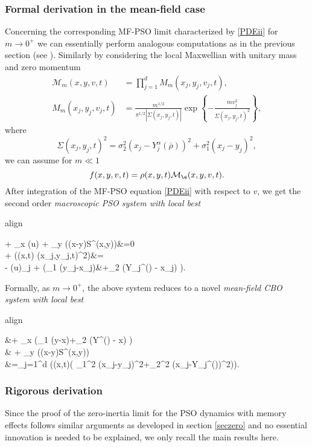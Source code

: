 \documentclass{ims9x6}
\newcommand{\coloredeq}[2]{\begin{empheq}[box={\mymath[colback=gray!13, sharp corners]}]{align}\label{#1}#2\end{empheq}}
\renewcommand{\bar}{\overline}
\begin{document}
\subsubsection{Formal derivation in the mean-field case}
Concerning the corresponding MF-PSO limit characterized by \eqref{PDEii} for $m\to 0^+$ we can essentially perform analogous computations as in the previous section (see \cite{Grassi2021PSO}). Similarly by considering the local Maxwellian with unitary mass and zero momentum
\[
\begin{split}
{\mathcal M}_m(x,y,v,t)&= \prod_{j=1}^d M_{m}(x_j,y_j,v_j,t), \\
M_{m}(x_j,y_j,v_j,t) &= \frac{m^{1/2}}{\pi^{1/2} |\Sigma(x_j,y_j,t)|} 
\exp\left\{-\frac{m v_j^2}{\Sigma(x_j,y_j,t)^2}\right\},
\end{split}
\]
where
\[
\Sigma(x_j,y_j,t)^2 = {\sigma_2^2}(x_j - Y^\alpha_j(\bar\rho))^2+{\sigma_1^2}(x_j - y_j)^2,
\]
we can assume for $m \ll 1$
\begin{equation}
f(x,y,v,t)=\rho(x,y,t){\mathcal M}_\e(x,y,v,t).
\label{eq:maxw2}
\end{equation}
After integration of the MF-PSO equation \eqref{PDEii} with respect to $v$, we get the second order \emph{macroscopic PSO system with local best}
\coloredeq{eq:macro2}{
\begin{split}
\frac{\partial \rho}{\partial t} + \nabla_x \cdot (\rho u) + \nabla_y \cdot \left(\nu(x-y)S^\beta(x,y)\rho\right)&=0\\
\frac{\partial (\rho u)_j}{\partial t} + \frac{\sigma^2}{2 m}\frac{\partial}{\partial x_j} \left(\rho(x,t) \Sigma(x_j,y_j,t)^2\right)&= \\
-\frac{\gamma}{m} (\rho u)_j + \frac1{m} (\lambda_1 (y_j-x_j)&+\lambda_2 (Y_j^\alpha(\bar\rho) - x_j) )\rho.
\end{split}}
Formally, as $m\to 0^+$, the above system reduces to a novel \emph{mean-field CBO system with local best}
\coloredeq{eq:CBOlb}{
\begin{split}
\frac{\partial \rho}{\partial t} &+ \nabla_x \cdot \left(\lambda_1 (y-x)+\lambda_2 (Y^\alpha(\bar\rho) - x) \right)\rho\\
& + \nabla_y \cdot \left(\nu(x-y)S^\beta(x,y)\rho\right)\\
 &=\frac{1}{2}\sum_{j=1}^d \frac{\partial^2}{\partial x^2_j} \left(\rho(x,t)\left( \sigma_1^2 (x_j-y_j)^2+\sigma_2^2 (x_j-Y_j^\alpha(\bar\rho))^2\right)\right).
\end{split}}

\subsubsection{Rigorous derivation}
Since the proof of the zero-inertia limit for the PSO dynamics with memory effects follows similar arguments as developed in section \ref{seczero} and  no essential innovation is needed to be explained, we only recall the main results here.
\end{document}
